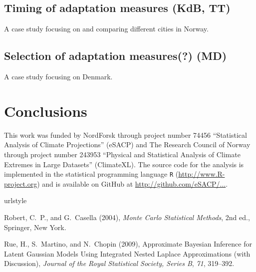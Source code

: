 \documentclass[wrr, draft]{agutex}
\begin{document}
\begin{article}
\subsection{Timing of adaptation measures {\color{blue} (KdB, TT)}}

A case study focusing on and comparing different cities in Norway.

\subsection{Selection of adaptation measures(?) {\color{blue} (MD)}}

A case study focusing on Denmark. 

\section{Conclusions}

\begin{acknowledgments}
This work was funded by NordForsk through project number 74456 ``Statistical Analysis of Climate Projections'' (eSACP) and The Research Council of Norway through project number 243953 ``Physical and Statistical Analysis of Climate Extremes in Large Datasets'' (ClimateXL). The source code for the analysis is implemented in the statistical programming language {\tt R} (\url{http://www.R-project.org}) and is available on GitHub at \url{http://github.com/eSACP/...}.
\end{acknowledgments}


% 

\begin{thebibliography}{37}
\providecommand{\natexlab}[1]{#1}
\expandafter\ifx\csname urlstyle\endcsname\relax
  \providecommand{\doi}[1]{doi:\discretionary{}{}{}#1}\else
  \providecommand{\doi}{doi:\discretionary{}{}{}\begingroup
  \urlstyle{rm}\Url}\fi

Robert, C.~P., and G.~Casella (2004), \textit{Monte Carlo Statistical Methods},
  2nd ed., Springer, New York.

Rue, H., S.~Martino, and N.~Chopin (2009), {Approximate {B}ayesian Inference
  for Latent {G}aussian Models Using Integrated Nested {L}aplace Approximations
  (with Discussion)}, \textit{Journal of the Royal Statistical Society, Series
  B}, \textit{71}, 319--392.


\end{thebibliography}

\end{article}

\end{document}
